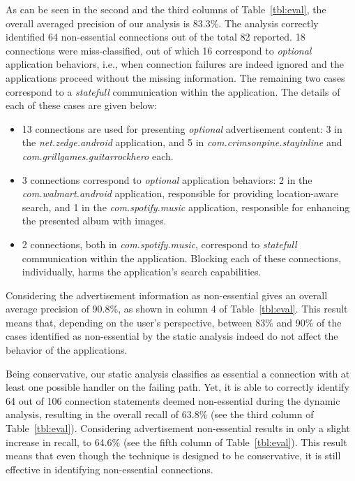 As can be seen in the second and the third columns of Table~\ref{tbl:eval}, the overall averaged precision of our analysis is 83.3\%. 
The analysis correctly identified 64 non-essential connections out of the total 82 reported. 
18 connections were miss-classified, out of which 16 correspond to \emph{optional} application behaviors, i.e.,
when connection failures are indeed ignored and the applications proceed without the missing information. The 
remaining two cases correspond to a \emph{statefull} communication within the application. 
The details of each of these cases are given below: 

\begin{itemize}\setlength{\itemsep}{-0.05in}
\item 13 connections are used for presenting \emph{optional} advertisement content: 
3 in the \emph{net.zedge.android} application, and 
5 in \emph{com.crimsonpine.stayinline} and \emph{com.grillgames.guitarrockhero} each.
\item 3 connections correspond to 
\emph{optional} application behaviors: 2 in the \emph{com.walmart.android} application, responsible for providing location-aware search, and 1 in the \emph{com.spotify.music} application, responsible for enhancing the presented album with images.
\item 2 connections, both in \emph{com.spotify.music}, correspond to \emph{statefull} communication within the application. 
Blocking each of these connections, individually, harms the application's search capabilities.
\end{itemize}

Considering the advertisement information as non-essential gives an overall average precision of 90.8\%, as shown in column 4 of Table~\ref{tbl:eval}. 
This result means that, depending on the user's perspective, 
between 83\% and 90\% of the cases identified as non-essential by the static analysis indeed do not affect the behavior of the applications. 

Being conservative, our static analysis classifies as essential a connection with at least one possible handler on the failing path. Yet, it is able to correctly identify 64 out of 106 connection statements deemed non-essential during the dynamic analysis, resulting in the overall recall of 63.8\% (see the third column of Table~\ref{tbl:eval}). Considering advertisement non-essential results in only a slight increase in recall, to 64.6\% (see the fifth column of Table~\ref{tbl:eval}). This result means that even though the technique is designed to be conservative, it is still effective in identifying non-essential connections.

